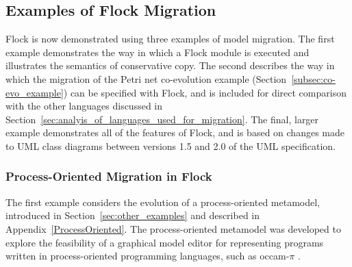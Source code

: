 \subsection{Examples of Flock Migration}
\label{subsec:flock_examples}
Flock is now demonstrated using three examples of model migration. The first example demonstrates the way in which a Flock module is executed and illustrates the semantics of conservative copy. The second describes the way in which the migration of the Petri net co-evolution example (Section~\ref{subsec:co-evo_example}) can be specified with Flock, and is included for direct comparison with the other languages discussed in Section~\ref{sec:analyis_of_languages_used_for_migration}. The final, larger example demonstrates all of the features of Flock, and is based on changes made to UML class diagrams between versions 1.5 and 2.0 of the UML specification.

\subsubsection{Process-Oriented Migration in Flock}
\label{subsec:po_flock_example}
The first example considers the evolution of a process-oriented metamodel, introduced in Section~\ref{sec:other_examples} and described in Appendix~\ref{ProcessOriented}. The process-oriented metamodel was developed to explore the feasibility of a graphical model editor for representing programs written in process-oriented programming languages, such as occam-$\pi$ \cite{occam_pi}.

